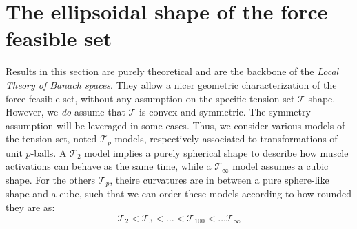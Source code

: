 

\section{The ellipsoidal shape of the force feasible set}
\label{sec:ellipsoidal_shape_ffs}
Results in this section are purely theoretical and are the backbone of the \emph{Local Theory of Banach spaces}. They allow a nicer geometric characterization of the force feasible set, without any assumption on the specific tension set $\mathcal{T}$ shape. However, we \emph{do} assume that $\mathcal{T}$ is convex and symmetric. The symmetry assumption will be leveraged in some cases. Thus, we consider various models of the tension set, noted $\mathcal{T}_p$ models, respectively associated to transformations of unit $p$-balls. A $\mathcal{T}_2$ model implies a purely spherical shape to describe how muscle activations can behave as the same time, while a $\mathcal{T}_{\infty}$ model assumes a cubic shape. For the others $\mathcal{T}_p$, theire curvatures are in between a pure sphere-like shape and a cube, such that we can order these models according to how rounded they are as:
$$\mathcal{T}_2 < \mathcal{T}_3 < \dots < \mathcal{T}_{100} < \dots \mathcal{T}_{\infty}$$

